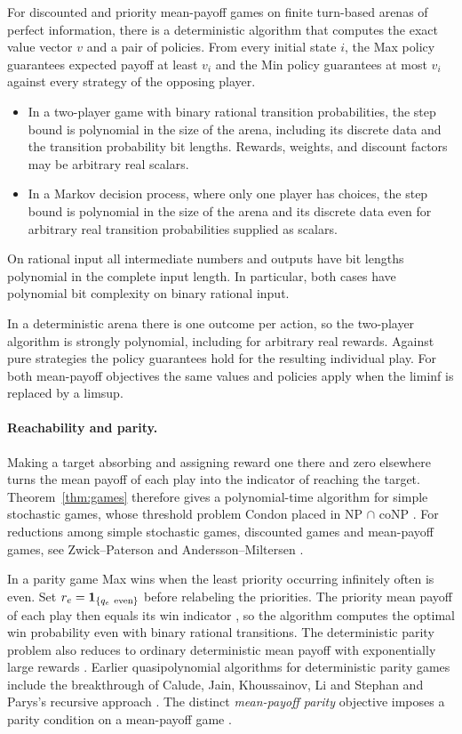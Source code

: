 \begin{theorem}\label{thm:games}
For discounted and priority mean-payoff games on finite turn-based
arenas of perfect information, there is a deterministic algorithm that
computes the exact value vector \(v\) and a pair of policies. From
every initial state \(i\), the Max policy guarantees expected payoff
at least \(v_i\) and the Min policy guarantees at most \(v_i\) against
every strategy of the opposing player.
\begin{itemize}
 \item In a two-player game with binary rational transition
 probabilities, the step bound is polynomial in the size of the arena,
 including its discrete data and the transition probability bit
 lengths. Rewards, weights, and discount factors may be arbitrary real
 scalars.
 \item In a Markov decision process, where only one player has choices,
 the step bound is polynomial in the size of the arena and its discrete
 data even for arbitrary real transition probabilities supplied as scalars.
\end{itemize}
On rational input all intermediate numbers and outputs have bit lengths
polynomial in the complete input length. In particular, both cases have
polynomial bit complexity on binary rational input.
\end{theorem}

In a deterministic arena there is one outcome per action, so the
two-player algorithm is strongly polynomial, including for arbitrary
real rewards. Against pure strategies the policy guarantees hold for
the resulting individual play. For both mean-payoff objectives the
same values and policies apply when the liminf is replaced by a limsup.

\paragraph{Reachability and parity.}
Making a target absorbing and assigning reward one there and zero
elsewhere turns the mean payoff of each play into the indicator of
reaching the target. Theorem~\ref{thm:games} therefore gives a
polynomial-time algorithm for simple stochastic games, whose threshold
problem Condon placed in NP \(\cap\) coNP \cite{Cond}. For reductions
among simple stochastic games, discounted games and mean-payoff games,
see Zwick--Paterson \cite{ZP} and Andersson--Miltersen \cite{AM}.

In a parity game Max wins when the least priority occurring infinitely
often is even. Set \(r_e=\mathbf 1_{\{q_e\ {\rm even}\}}\) before
relabeling the priorities. The priority mean payoff of each play then
equals its win indicator \cite{GZ}, so the algorithm computes the
optimal win probability even with binary rational transitions.
The deterministic parity problem also reduces to ordinary deterministic
mean payoff with exponentially large rewards \cite{Jur}. Earlier
quasipolynomial algorithms for deterministic parity games include the
breakthrough of Calude, Jain, Khoussainov, Li and Stephan \cite{Cal}
and Parys's recursive approach \cite{Parys}. The distinct
\emph{mean-payoff parity} objective imposes a parity condition on a
mean-payoff game \cite{OAIMe}.

